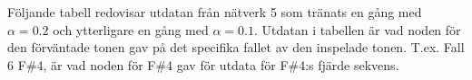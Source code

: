\documentclass[a4paper,10pt]{article}
\begin{document}
\begin{centering}
{%
}
\end{centering}

\break

Följande tabell redovisar utdatan från nätverk 5 som tränats en gång med $\alpha=0.2$ och ytterligare en gång med $\alpha=0.1$. Utdatan i tabellen är vad noden för den förväntade tonen gav på det specifika fallet av den inspelade tonen. T.ex. Fall 6 F\#4, är vad noden för F\#4 gav för utdata för F\#4:s fjärde sekvens.\\
\end{document}
